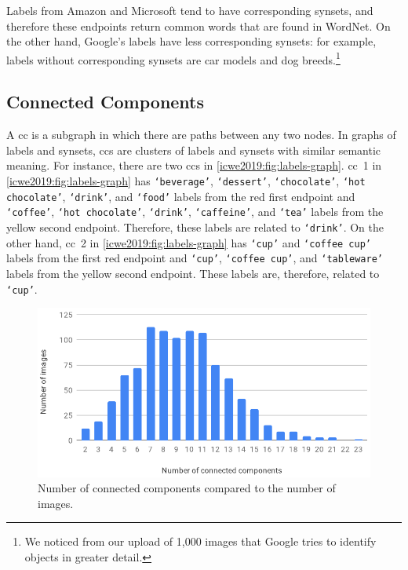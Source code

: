 Labels from Amazon and Microsoft tend to have corresponding synsets, and therefore these endpoints return common words that are found in WordNet.
On the other hand, Google's labels have less corresponding synsets: for example, labels without corresponding synsets are car models and dog breeds.\footnote{We noticed from our upload of 1,000 images that Google tries to identify objects in greater detail.}

\subsection{Connected Components}

A \gls{cc} is a subgraph in which there are paths between any two nodes.
In graphs of labels and synsets, \glspl{cc} are clusters of labels and synsets with similar semantic meaning.
For instance, there are two \glspl{cc} in \cref{icwe2019:fig:labels-graph}.
\gls{cc}~1 in \cref{icwe2019:fig:labels-graph} has \texttt{`beverage'}, \texttt{`dessert'}, \texttt{`chocolate'}, \texttt{`hot chocolate'}, \texttt{`drink'}, and \texttt{`food'} labels from the red first endpoint and \texttt{`coffee'}, \texttt{`hot chocolate'}, \texttt{`drink'}, \texttt{`caffeine'}, and \texttt{`tea'} labels from the yellow second endpoint.
Therefore, these labels are related to \texttt{`drink'}.
On the other hand, \gls{cc}~2 in \cref{icwe2019:fig:labels-graph} has \texttt{`cup'} and \texttt{`coffee cup'} labels from the first red endpoint and \texttt{`cup'}, \texttt{`coffee cup'}, and \texttt{`tableware'} labels from the yellow second endpoint.
These labels are, therefore, related to \texttt{`cup'}.

\begin{figure}
\centering\includegraphics[width=.95\linewidth]{connected_components}
\caption[Connected components vs. images]{Number of connected components compared to the number of images.}\label{icwe2019:fig:connected-components}
\end{figure}

